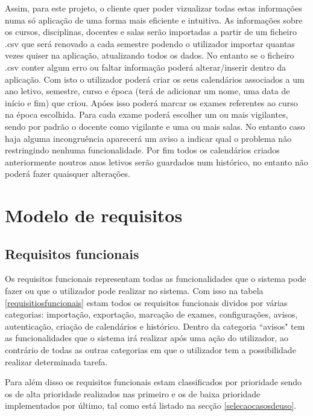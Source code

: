 \documentclass[11pt, twoside]{report}
\begin{document}
	Assim, para este projeto, o cliente quer poder vizualizar todas estas informações numa só aplicação de uma forma mais eficiente e intuitiva. As informações sobre os cursos, disciplinas, docentes e salas serão importadas a partir de um ficheiro .csv que será renovado a cada semestre podendo o utilizador importar quantas vezes quiser na aplicação, atualizando todos os dados. No entanto se o ficheiro .csv conter algum erro ou faltar informação poderá alterar/inserir dentro da aplicação. Com isto o utilizador poderá criar os seus calendários associados a um ano letivo, semestre, curso e época (terá de adicionar um nome, uma data de início e fim) que criou. Apóes isso poderá marcar os exames referentes ao curso na época escolhida. Para cada exame poderá escolher um ou mais vigilantes, sendo por padrão o docente como vigilante e uma ou mais salas. No entanto caso haja alguma incongruência aparecerá um aviso a indicar qual o problema não restringindo nenhuma funcionalidade. Por fim todos os calendários criados anteriormente noutros anos letivos serão guardados num histórico, no entanto não poderá fazer quaisquer alterações.
	
	\chapter{Modelo de requisitos}
	\label{requisitos}
	\section{Requisitos funcionais}
	
	
	Os requisitos funcionais representam todas as funcionalidades que o sistema pode fazer ou que o utilizador pode realizar no sistema. Com isso na tabela \ref{requisitiosfuncionais} estam todos os requisitos funcionais dividos por várias categorias: importação, exportação, marcação de exames, configurações, avisos, autenticação, criação de calendários e histórico. Dentro da categoria ``avisos" tem as funcionalidades que o sistema irá realizar após uma ação do utilizador, ao contrário de todas as outras categorias em que o utilizador tem a possibilidade realizar determinada tarefa.
	
	Para além disso os requisitos funcionais estam classificados por prioridade sendo os de alta prioridade realizados nas primeiro e os de baixa prioridade implementados por último, tal como está listado na secção \ref{selecaocasosdeuso}.  
	
	
	
\end{document}
